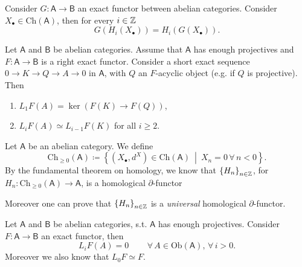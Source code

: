 \begin{lem}
	Consider $G\colon\mathsf{A} \to \mathsf{B}$ an exact functor between abelian categories.
	Consider $X_{\bullet} \in \mathrm{Ch}(\mathsf{A})$, then for every $i \in \mathbb{Z}$
	\begin{equation}
		G \left( H_{i}\left( X_{\bullet} \right) \right) =
		H_{i}\left( G(X_{\bullet}) \right)
	.\end{equation} 
\end{lem} 

\begin{lem}
	Let $\mathsf{A}$ and $\mathsf{B}$ be abelian categories.
	Assume that $\mathsf{A}$ has enough projectives and $F\colon\mathsf{A} \to \mathsf{B}$
	is a right exact functor.
	Consider a short exact sequence $0 \to K \to Q \to A \to 0$ in $\mathsf{A}$,
	with $Q$ an $F$-acyclic object (e.g. if $Q$ is projective).
	Then
	\begin{enumerate}
		\item $L_1 F(A) = \ker \left( F(K) \to F(Q) \right)$,
		\item $L_iF(A) \simeq L_{i-1} F(K)$ for all $i \geq 2$.
	\end{enumerate}
\end{lem} 

\begin{rem}[]
	Let $\mathsf{A}$ be an abelian category. We define
	\begin{equation}
	\mathrm{Ch}_{\geq 0}(\mathsf{A}) \coloneqq
	\left\{ \left( X_{\bullet}, d^{X} \right) \in \mathrm{Ch}(\mathsf{A}) \ \middle|\ 
	X_n = 0 \,\forall\, n < 0\right\}
	.\end{equation} 
	By the fundamental theorem on homology, we know that $\left\{ H_n \right\}_{n \in \mathbb{Z}}$,
	for $H_n\colon\mathrm{Ch}_{\geq 0}(\mathsf{A}) \to \mathsf{A}$,
	is a homological $\partial$-functor
\end{rem}

\begin{lem}
	Moreover one can prove that $\left\{ H_n \right\}_{n \in \mathbb{Z}}$ is a {\em universal}
	homological $\partial$-functor.
\end{lem} 

\begin{lem}
	Let $\mathsf{A}$ and $\mathsf{B}$ be abelian categories, s.t. $\mathsf{A}$ has enough projectives.
	Consider $F\colon\mathsf{A} \to \mathsf{B}$ an exact functor, then
	\begin{equation}
		L_i F(A) = 0 \qquad
		\,\forall\, A \in \mathrm{Ob} \left(\mathsf{A}\right), \,\forall\, i > 0
	.\end{equation} 
	Moreover we also know that $L_0 F \simeq F$.
\end{lem} 

